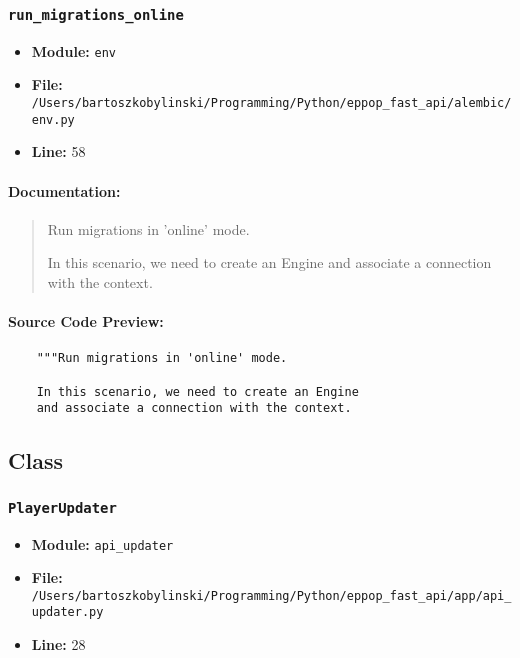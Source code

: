 \documentclass[11pt,a4paper]{article}
\begin{document}
\vspace{1em}
\subsubsection{\texttt{run\_migrations\_online}}

\begin{itemize}
    \item \textbf{Module:} \texttt{env}
    \item \textbf{File:} \texttt{/Users/bartoszkobylinski/Programming/Python/eppop\_fast\_api/alembic/env.py}
    \item \textbf{Line:} 58
\end{itemize}

\paragraph{Documentation:}
\begin{quote}
Run migrations in 'online' mode.

In this scenario, we need to create an Engine
and associate a connection with the context.
\end{quote}

\paragraph{Source Code Preview:}
\begin{verbatim}
    """Run migrations in 'online' mode.

    In this scenario, we need to create an Engine
    and associate a connection with the context.

\end{verbatim}

\vspace{1em}
\subsection{Class}

\subsubsection{\texttt{PlayerUpdater}}

\begin{itemize}
    \item \textbf{Module:} \texttt{api\_updater}
    \item \textbf{File:} \texttt{/Users/bartoszkobylinski/Programming/Python/eppop\_fast\_api/app/api\_updater.py}
    \item \textbf{Line:} 28
\end{itemize}
\end{document}

